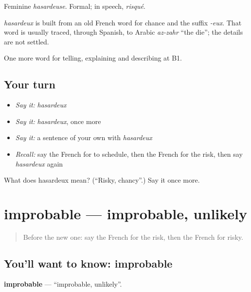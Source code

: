 Feminine \emph{hasardeuse}. Formal; in speech, \emph{risqué}.

\begin{cousinweb}
\emph{hasardeux} is built from an old French word for chance and the suffix \emph{-eux}. That word is usually traced, through Spanish, to Arabic \emph{az-zahr} \textquotedblleft{}the die\textquotedblright{}; the details are not settled.
\end{cousinweb}

\begin{grammarlens}[title={What you've built}]
One more word for telling, explaining and describing at B1.
\end{grammarlens}

\subsection*{Your turn}
\begin{itemize}
\raggedright
  \item \emph{Say it:} \emph{hasardeux}
  \item \emph{Say it:} \emph{hasardeux}, once more
  \item \emph{Say it:} a sentence of your own with \emph{hasardeux}
  \item \emph{Recall:} say the French for to schedule, then the French for the risk, then say \emph{hasardeux} again
\end{itemize}

\begin{tcolorbox}[breakable,colback=teal!4,colframe=teal!35!black,title={Before you move on}]
What does hasardeux mean? (\textquotedblleft{}Risky, chancy\textquotedblright{}.) Say it once more.
\end{tcolorbox}
\section[improbable]{improbable — improbable, unlikely}

\label{lesson:FR-C372-improbable}



\begin{quote}
Before the new one: say the French for the risk, then the French for risky.
\end{quote}

\subsection*{You'll want to know: improbable}
\textbf{improbable} — \textquotedblleft{}improbable, unlikely\textquotedblright{}.

